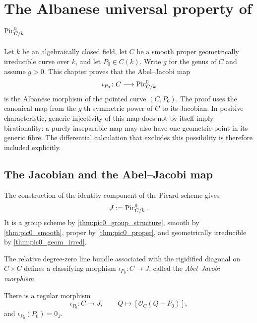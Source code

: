 \chapter{The Albanese universal property of \(\operatorname{Pic}^0_{C/k}\)}
\label{chap:Albanese_AlbaneseUP}

Let \(k\) be an algebraically closed field, let \(C\) be a smooth proper
geometrically irreducible curve over \(k\), and let \(P_0\in C(k)\).  Write
\(g\) for the genus of \(C\) and assume \(g>0\).  This chapter proves that
the Abel--Jacobi map
\[
  \iota_{P_0}\colon C\longrightarrow \operatorname{Pic}^0_{C/k}
\]
is the Albanese morphism of the pointed curve \((C,P_0)\).  The proof uses
the canonical map from the \(g\)-th symmetric power of \(C\) to its
Jacobian.  In positive characteristic, generic injectivity of this map does
not by itself imply birationality: a purely inseparable map may also have
one geometric point in its generic fibre.  The differential calculation
that excludes this possibility is therefore included explicitly.

\section{The Jacobian and the Abel--Jacobi map}
\label{sec:albaneseup_setup}

The construction of the identity component of the Picard scheme gives
\[
  J:=\operatorname{Pic}^0_{C/k}.
\]
It is a group scheme by \cref{thm:pic0_group_structure}, smooth by
\cref{thm:pic0_smooth}, proper by \cref{thm:pic0_proper}, and geometrically
irreducible by \cref{thm:pic0_geom_irred}.

\begin{definition}
  \label{def:abel_jacobi_morphism}

  The relative degree-zero line bundle associated with the rigidified
  diagonal on \(C\times C\) defines a classifying morphism
  \(\iota_{P_0}\colon C\to J\), called the \emph{Abel--Jacobi morphism}.
\end{definition}

\begin{lemma}
  \label{lem:abel_jacobi_morphism}

  There is a regular morphism
  \[
    \iota_{P_0}\colon C\longrightarrow J,
    \qquad Q\longmapsto [\mathcal O_C(Q-P_0)],
  \]
  and \(\iota_{P_0}(P_0)=0_J\).
\end{lemma}

